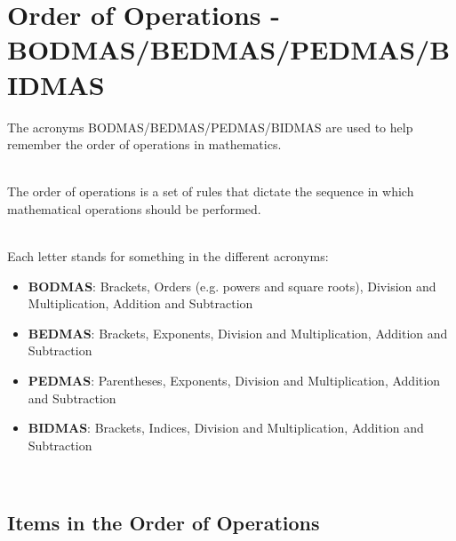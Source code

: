 \documentclass{article}
\date{}
\begin{document}
\fontsize{13}{15} \selectfont %

\section{Order of Operations -  BODMAS/BEDMAS/PEDMAS/BIDMAS}

The acronyms BODMAS/BEDMAS/PEDMAS/BIDMAS are used to help remember the order of operations in mathematics. 

\vspace{5pt}
\\ 
The order of operations is a set of rules that dictate the sequence in which mathematical operations should be performed. 

\vspace{5pt}
\\ 
Each letter stands for something in the different acronyms:

\begin{itemize}
\item \textbf{BODMAS}: Brackets, Orders (e.g. powers and square roots), Division and Multiplication, Addition and Subtraction
\\

\item \textbf{BEDMAS}: Brackets, Exponents, Division and Multiplication, Addition and Subtraction
\\

\item \textbf{PEDMAS}: Parentheses, Exponents, Division and Multiplication, Addition and Subtraction 
\\

\item \textbf{BIDMAS}: Brackets, Indices, Division and Multiplication, Addition and Subtraction
\end{itemize}

\vspace{5pt}
\\

\subsection{Items in the Order of Operations}
\end{document}
